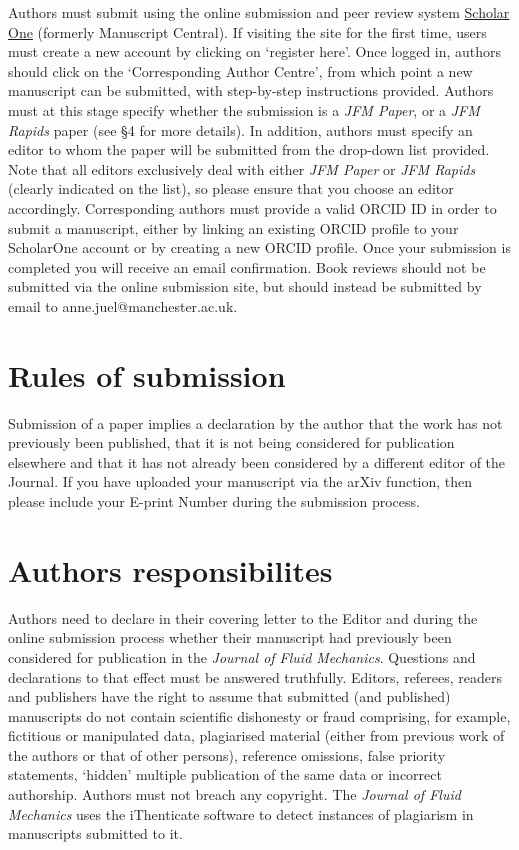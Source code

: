 \documentclass[lineno]{jfm}
\begin{document}
 Authors must submit using the online submission and peer review system \href{https://mc.manuscriptcentral.com/jfm} {Scholar One} (formerly Manuscript Central). If visiting the site for the first time, users must create a new account by clicking on `register here'. Once logged in, authors should click on the `Corresponding Author Centre', from which point a new manuscript can be submitted, with step-by-step instructions provided. Authors must at this stage specify whether the submission is a {\it JFM Paper}, or a {\it JFM Rapids} paper (see \S4 for more details). In addition, authors must specify an editor to whom the paper will be submitted from the drop-down list provided. Note that all editors exclusively deal with either {\it JFM Paper} or {\it JFM Rapids} (clearly indicated on the list), so please ensure that you choose an editor accordingly. Corresponding authors must provide a valid ORCID ID in order to submit a manuscript, either by linking an existing ORCID profile to your ScholarOne account or by creating a new ORCID profile. Once your submission is completed you will receive an email confirmation. Book reviews should not be submitted via the online submission site, but should instead be submitted by email to anne.juel@manchester.ac.uk.
%

\section{Rules of submission}\label{sec:rules_submission}
 Submission of a paper implies a declaration by the author that the work has not previously been published, that it is not being considered for publication elsewhere and that it has not already been considered by a different editor of the Journal.  If you have uploaded your manuscript via the arXiv function, then please include your E-print Number during the submission process.

\section {Authors responsibilites}
 Authors need to declare in their covering letter to the Editor and during the online submission process whether their manuscript had previously been considered for publication in the {\it Journal of Fluid Mechanics}.  Questions and declarations to that effect must be answered truthfully.
Editors, referees, readers and publishers have the right to assume that submitted (and published) manuscripts do not contain scientific dishonesty or fraud comprising, for example, fictitious or manipulated data, plagiarised material (either from previous work of the authors or that of other persons), reference omissions, false priority statements, `hidden' multiple publication of the same data or incorrect authorship.  Authors must not breach any copyright.  The {\it Journal of Fluid Mechanics} uses the iThenticate software to detect instances of plagiarism in manuscripts submitted to it.
\end{document}
